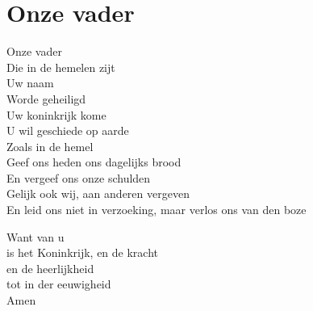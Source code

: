\section{Onze vader}
Onze vader\\
Die in de hemelen zijt\\
Uw naam\\
Worde geheiligd\\

Uw koninkrijk kome\\
U wil geschiede op aarde\\
Zoals in de hemel\\

Geef ons heden ons dagelijks brood\\
En vergeef ons onze schulden\\
Gelijk ook wij, aan anderen vergeven\\

En leid ons niet in verzoeking, maar verlos ons van den boze

Want van u\\
is het Koninkrijk, en de kracht\\
en de heerlijkheid\\
tot in der eeuwigheid\\
Amen